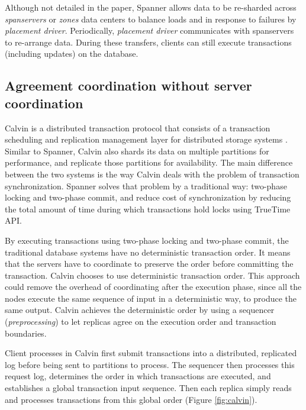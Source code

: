 Although not detailed in the paper, Spanner allows data to be re-sharded across
\emph{spanservers} or \emph{zones} data centers to balance loads and in response
to failures by \emph{placement driver}. Periodically, \emph{placement driver}
communicates with spanservers to re-arrange data. During these transfers,
clients can still execute transactions (including updates) on the database.


\subsection{Agreement coordination without server coordination}

Calvin is a distributed transaction protocol that consists of a transaction
scheduling and replication management layer for distributed storage systems
\cite{calvin}. Similar to Spanner, Calvin also shards its data on multiple
partitions for performance, and replicate those partitions for availability. The
main difference between the two systems is the way Calvin deals with the problem
of transaction synchronization. Spanner solves that problem by a traditional
way: two-phase locking and two-phase commit, and reduce cost of synchronization
by reducing the total amount of time during which transactions hold locks using
TrueTime API.

By executing transactions using two-phase locking and two-phase commit, the
traditional database systems have no deterministic transaction order. It means
that the servers have to coordinate to preserve the order before committing the
transaction. Calvin chooses to use deterministic transaction order. This
approach could remove the overhead of coordinating after the execution phase,
since all the nodes execute the same sequence of input in a deterministic way,
to produce the same output. Calvin achieves the deterministic order by using
a sequencer (\emph{preprocessing}) to let replicas agree on the execution order and
transaction boundaries.

Client processes in Calvin first submit transactions into a distributed,
replicated log before being sent to partitions to process. The sequencer then
processes this request log, determines the order in which transactions are
executed, and establishes a global transaction input sequence. Then each replica
simply reads and processes transactions from this global order (Figure
\ref{fig:calvin}).

